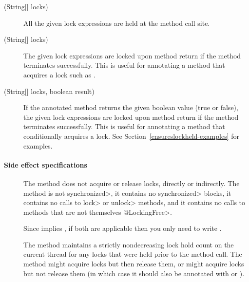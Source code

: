 \begin{sloppypar}
\begin{description}
\item[\small{(String[] locks)}]
  All the given lock expressions
  are held at the method call site.

\item[\small{(String[] locks)}]
  The given lock
  expressions are
  locked upon method return if the method
  terminates successfully.  This is useful for annotating a
  method that acquires a lock such as
  .

\item[\small{(String[] locks, boolean result)}]
  If the annotated method returns the given
  boolean value (true or false), the given lock
  expressions are locked upon method return if the method
  terminates successfully.
  This is useful for annotating a
  method that conditionally acquires a lock.
  See Section~\ref{ensureslockheld-examples} for examples.

\end{description}

\paragraph{Side effect specifications\label{lock-side-effect-specifications}}

\begin{description}

\item[]
  The method does not acquire or release locks,
  directly or indirectly.  The method is not \<synchronized>, it contains
  no \<synchronized> blocks, it contains no calls to \<lock> or \<unlock>
  methods, and it contains no calls to methods that are not themselves \<@LockingFree>.

  Since
   implies , if both are applicable
  then you only need to write .

\item[]
  The method maintains a strictly nondecreasing lock hold count on the
  current thread for any locks that were held prior
  to the method call.  The method might acquire locks but then release
  them, or might acquire locks but not release them (in which case it should
  also be annotated with
   or
  ).


\end{description}
\end{sloppypar}

